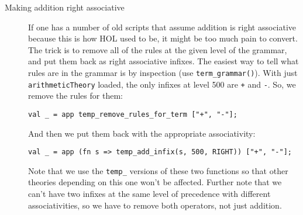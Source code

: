 {\begin{description}
\item[Making addition right associative] If one has a number of old
  scripts that assume addition is right associative because this is
  how HOL used to be, it might be too much pain to convert.  The trick
  is to remove all of the rules at the given level of the grammar, and
  put them back as right associative infixes.  The easiest way to tell
  what rules are in the grammar is by inspection (use
  \texttt{term\_grammar()}).  With just \texttt{arithmeticTheory}
  loaded, the only infixes at level 500 are \texttt{+} and
  \texttt{-}.  So, we remove the rules for them:
  \begin{verbatim}
val _ = app temp_remove_rules_for_term ["+", "-"];
\end{verbatim}
  \noindent And then we put them back with the appropriate
  associativity:
\begin{verbatim}
val _ = app (fn s => temp_add_infix(s, 500, RIGHT)) ["+", "-"];
\end{verbatim}
\noindent Note that we use the \texttt{temp\_} versions of these two
functions so that other theories depending on this one won't be
affected.  Further note that we can't have two infixes at the same
level of precedence with different associativities, so we have to
remove both operators, not just addition.

\end{description}

}

